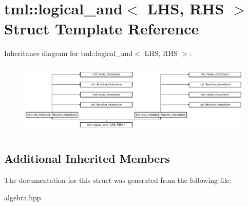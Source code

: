 \hypertarget{structtml_1_1logical__and}{\section{tml\+:\+:logical\+\_\+and$<$ L\+H\+S, R\+H\+S $>$ Struct Template Reference}
\label{structtml_1_1logical__and}
}
Inheritance diagram for tml\+:\+:logical\+\_\+and$<$ L\+H\+S, R\+H\+S $>$\+:\begin{figure}[H]
\begin{center}
\leavevmode
\includegraphics[height=3.500000cm]{structtml_1_1logical__and}
\end{center}
\end{figure}
\subsection*{Additional Inherited Members}


The documentation for this struct was generated from the following file\+:\begin{DoxyCompactItemize}
\item 
algebra.\+hpp\end{DoxyCompactItemize}
